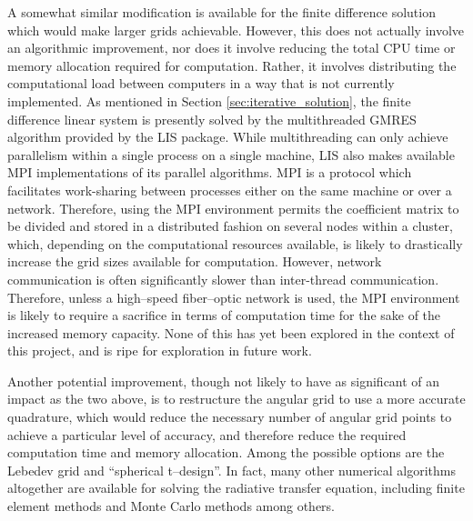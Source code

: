 A somewhat similar modification is available for the finite difference solution which would make larger grids achievable.
However, this does not actually involve an algorithmic improvement, nor does it involve reducing the total CPU time or memory allocation required for computation.
Rather, it involves distributing the computational load between computers in a way that is not currently implemented.
As mentioned in Section \ref{sec:iterative_solution}, the finite difference linear system is presently solved by the multithreaded GMRES algorithm provided by the LIS package.
While multithreading can only achieve parallelism within a single process on a single machine, LIS also makes available MPI implementations of its parallel algorithms.
MPI is a protocol which facilitates work-sharing between processes either on the same machine or over a network.
Therefore, using the MPI environment permits the coefficient matrix to be divided and stored in a distributed fashion on several nodes within a cluster, which, depending on the computational resources available, is likely to drastically increase the grid sizes available for computation.
However, network communication is often significantly slower than inter-thread communication.
Therefore, unless a high--speed fiber--optic network is used, the MPI environment is likely to require a sacrifice in terms of computation time for the sake of the increased memory capacity.
None of this has yet been explored in the context of this project, and is ripe for exploration in future work.

Another potential improvement, though not likely to have as significant of an impact as the two above, is to restructure the angular grid to use a more accurate quadrature, which would reduce the necessary number of angular grid points to achieve a particular level of accuracy, and therefore reduce the required computation time and memory allocation.
Among the possible options are the Lebedev grid and ``spherical t--design''\cite{beentjes_quadrature_nodate,an_numerical_2016,beckmann_local_2014}.
In fact, many other numerical algorithms altogether are available for solving the radiative transfer equation, including finite element methods and Monte Carlo methods among others. %

